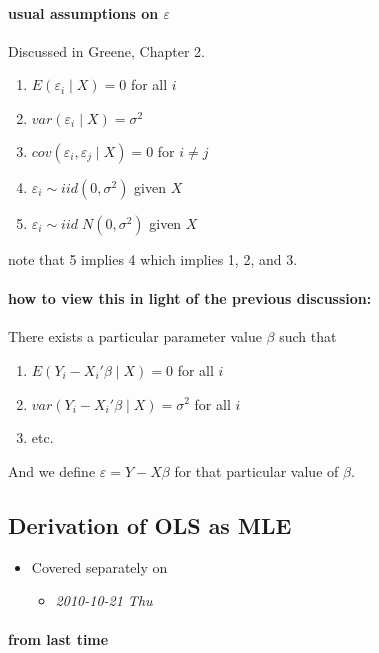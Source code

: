 \paragraph{usual assumptions on $\varepsilon$}
\label{sec-1-1-2}

      Discussed in Greene, Chapter 2.

\begin{enumerate}
\item $E(\varepsilon_i \mid X) = 0$ for all $i$
\item $var(\varepsilon_i \mid X) = \sigma^2$
\item $cov(\varepsilon_i, \varepsilon_j \mid X) = 0$ for $i \neq j$
\item $\varepsilon_i \sim iid(0,\sigma^2)$ given $X$
\item $\varepsilon_i \sim iid\; N(0,\sigma^2)$ given $X$
\end{enumerate}

      note that 5 implies 4 which implies 1, 2, and 3.
\paragraph{how to view this in light of the previous discussion:}
\label{sec-1-1-2-1}

       There exists a particular parameter value $\beta$ such that
\begin{enumerate}
\item $E(Y_i - X_i'\beta \mid X) = 0$ for all $i$
\item $var(Y_i - X_i'\beta \mid X) = \sigma^2$ for all $i$
\item etc.
\end{enumerate}

       And we define $\varepsilon = Y - X\beta$ for that particular value
       of $\beta$.
\subsection{Derivation of OLS as MLE}
\label{sec-1-2}

\begin{itemize}
\item Covered separately on
\begin{itemize}
\item \textit{2010-10-21 Thu}
\end{itemize}
\end{itemize}
\paragraph{from last time}
\label{sec-1-2-1}

